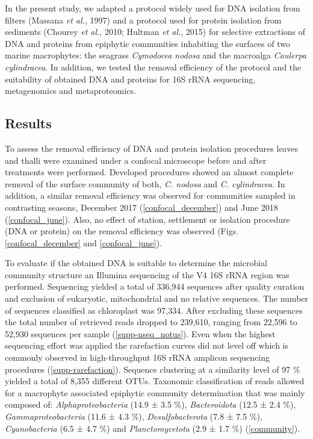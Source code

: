 \documentclass[12pt,]{article}
\begin{document}
In the present study, we adapted a protocol widely used for DNA
isolation from filters (Massana \emph{et al.}, 1997) and a protocol used
for protein isolation from sediments (Chourey \emph{et al.}, 2010;
Hultman \emph{et al.}, 2015) for selective extractions of DNA and
proteins from epiphytic communities inhabiting the surfaces of two
marine macrophytes: the seagrass \emph{Cymodocea nodosa} and the
macroalga \emph{Caulerpa cylindracea}. In addition, we tested the
removal efficiency of the protocol and the suitability of obtained DNA
and proteins for 16S rRNA sequencing, metagenomics and metaproteomics.

\newpage

\hypertarget{results}{%
\subsection{Results}\label{results}}

To assess the removal efficiency of DNA and protein isolation procedures
leaves and thalli were examined under a confocal microscope before and
after treatments were performed. Developed procedures showed an almost
complete removal of the surface community of both, \emph{C. nodosa} and
\emph{C. cylindracea}. In addition, a similar removal efficiency was
observed for communities sampled in contrasting seasons, December 2017
(\autoref{confocal_december}) and June 2018 (\autoref{confocal_june}).
Also, no effect of station, settlement or isolation procedure (DNA or
protein) on the removal efficiency was observed (Figs.
\ref{confocal_december} and \ref{confocal_june}).

To evaluate if the obtained DNA is suitable to determine the microbial
community structure an Illumina sequencing of the V4 16S rRNA region was
performed. Sequencing yielded a total of 336,944 sequences after quality
curation and exclusion of eukaryotic, mitochondrial and no relative
sequences. The number of sequences classified as chloroplast was 97,334.
After excluding these sequences the total number of retrieved reads
dropped to 239,610, ranging from 22,596 to 52,930 sequences per sample
(\autoref{supp-nseq_notus}). Even when the highest sequencing effort was
applied the rarefaction curves did not level off which is commonly
observed in high-throughput 16S rRNA amplicon sequencing procedures
(\autoref{supp-rarefaction}). Sequence clustering at a similarity level
of 97 \si{\percent} yielded a total of 8,355 different OTUs. Taxonomic
classification of reads allowed for a macrophyte associated epiphytic
community determination that was mainly composed of:
\emph{Alphaproteobacteria} (14.9 ± 3.5 \si{\percent}),
\emph{Bacteroidota} (12.5 ± 2.4 \si{\percent}),
\emph{Gammaproteobacteria} (11.6 ± 4.3 \si{\percent}),
\emph{Desulfobacterota} (7.8 ± 7.5 \si{\percent}), \emph{Cyanobacteria}
(6.5 ± 4.7 \si{\percent}) and \emph{Planctomycetota} (2.9 ± 1.7
\si{\percent}) (\autoref{community}).
\end{document}
